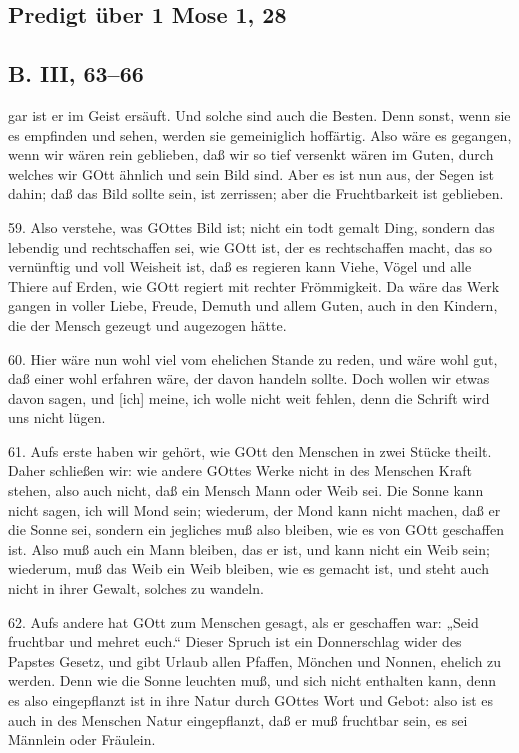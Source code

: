 \subsection{Predigt über 1 Mose 1, 28}

\subsection{B. III, 63–66}

gar ist er im Geist ersäuft. Und solche sind auch die Besten. Denn sonst, wenn sie es empfinden und sehen, werden sie gemeiniglich hoffärtig. Also wäre es gegangen, wenn wir wären rein geblieben, daß wir so tief versenkt wären im Guten, durch welches wir GOtt ähnlich und sein Bild sind. Aber es ist nun aus, der Segen ist dahin; daß das Bild sollte sein, ist zerrissen; aber die Fruchtbarkeit ist geblieben.

59. Also verstehe, was GOttes Bild ist; nicht ein todt gemalt Ding, sondern das lebendig und rechtschaffen sei, wie GOtt ist, der es rechtschaffen macht, das so vernünftig und voll Weisheit ist, daß es regieren kann Viehe, Vögel und alle Thiere auf Erden, wie GOtt regiert mit rechter Frömmigkeit. Da wäre das Werk gangen in voller Liebe, Freude, Demuth und allem Guten, auch in den Kindern, die der Mensch gezeugt und augezogen hätte.

60. Hier wäre nun wohl viel vom ehelichen Stande zu reden, und wäre wohl gut, daß einer wohl erfahren wäre, der davon handeln sollte. Doch wollen wir etwas davon sagen, und [ich] meine, ich wolle nicht weit fehlen, denn die Schrift wird uns nicht lügen.

61. Aufs erste haben wir gehört, wie GOtt den Menschen in zwei Stücke theilt. Daher schließen wir: wie andere GOttes Werke nicht in des Menschen Kraft stehen, also auch nicht, daß ein Mensch Mann oder Weib sei. Die Sonne kann nicht sagen, ich will Mond sein; wiederum, der Mond kann nicht machen, daß er die Sonne sei, sondern ein jegliches muß also bleiben, wie es von GOtt geschaffen ist. Also muß auch ein Mann bleiben, das er ist, und kann nicht ein Weib sein; wiederum, muß das Weib ein Weib bleiben, wie es gemacht ist, und steht auch nicht in ihrer Gewalt, solches zu wandeln.

62. Aufs andere hat GOtt zum Menschen gesagt, als er geschaffen war: „Seid fruchtbar und mehret euch.“ Dieser Spruch ist ein Donnerschlag wider des Papstes Gesetz, und gibt Urlaub allen Pfaffen, Mönchen und Nonnen, ehelich zu werden. Denn wie die Sonne leuchten muß, und sich nicht enthalten kann, denn es also eingepflanzt ist in ihre Natur durch GOttes Wort und Gebot: also ist es auch in des Menschen Natur eingepflanzt, daß er muß fruchtbar sein, es sei Männlein oder Fräulein.

